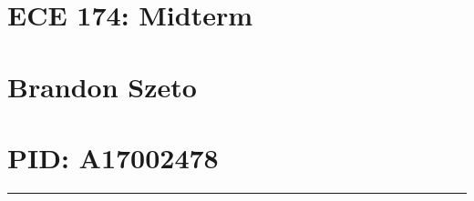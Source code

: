 \documentclass{cheatsheet}
\begin{document}
\section{ECE 174: Midterm}
\section{\normalsize Brandon Szeto}
\section{\normalsize PID: A17002478}

\vspace{2mm}

\hrule

\vspace{5mm}

\footnotesize




















\end{document}
